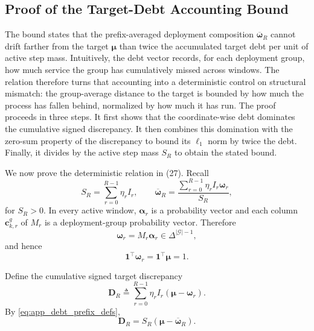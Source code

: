 \subsection{Proof of the Target-Debt Accounting Bound}
\label{app:proof_debt_bound}

The bound states that the prefix-averaged deployment composition
$\overline{\boldsymbol\omega}_R$ cannot drift farther from the target
$\boldsymbol\mu$ than twice the accumulated target debt per unit of active
step mass.  Intuitively, the debt vector records, for each deployment group,
how much service the group has cumulatively missed across windows.  The
relation therefore turns that accounting into a deterministic control on
structural mismatch: the group-average distance to the target is bounded by
how much the process has fallen behind, normalized by how much it has run.
The proof proceeds in three steps.  It first shows that the coordinate-wise
debt dominates the cumulative signed discrepancy.  It then combines this
domination with the zero-sum property of the discrepancy to bound its
$\ell_1$ norm by twice the debt.  Finally, it divides by the active step
mass $S_R$ to obtain the stated bound.

We now prove the deterministic relation in
(27).  Recall
\begin{equation}
    S_R
    =
    \sum_{r=0}^{R-1}\eta_rI_r,
    \qquad
    \overline{\boldsymbol\omega}_R
    =
    \frac{
    \sum_{r=0}^{R-1}
    \eta_rI_r\boldsymbol\omega_r
    }{S_R},
    \label{eq:app_debt_prefix_defs}
\end{equation}
for $S_R>0$.  In every active window,
$\boldsymbol\alpha_r$ is a probability vector and each column
$\mathbf{c}_{k,r}^{g}$ of $M_r$ is a deployment-group probability vector.
Therefore
\begin{equation}
    \boldsymbol\omega_r
    =
    M_r\boldsymbol\alpha_r
    \in
    \Delta^{|\mathcal G|-1},
    \label{eq:app_omega_simplex}
\end{equation}
and hence
\begin{equation}
    \mathbf{1}^{\top}\boldsymbol\omega_r
    =
    \mathbf{1}^{\top}\boldsymbol\mu
    =1.
    \label{eq:app_equal_mass}
\end{equation}

Define the cumulative signed target discrepancy
\begin{equation}
    \mathbf{D}_R
    \triangleq
    \sum_{r=0}^{R-1}
    \eta_rI_r
    \left(
    \boldsymbol\mu-\boldsymbol\omega_r
    \right).
    \label{eq:app_DR}
\end{equation}
By \eqref{eq:app_debt_prefix_defs},
\begin{equation}
    \mathbf{D}_R
    =
    S_R
    \left(
    \boldsymbol\mu-\overline{\boldsymbol\omega}_R
    \right).
    \label{eq:app_DR_baromega}
\end{equation}

